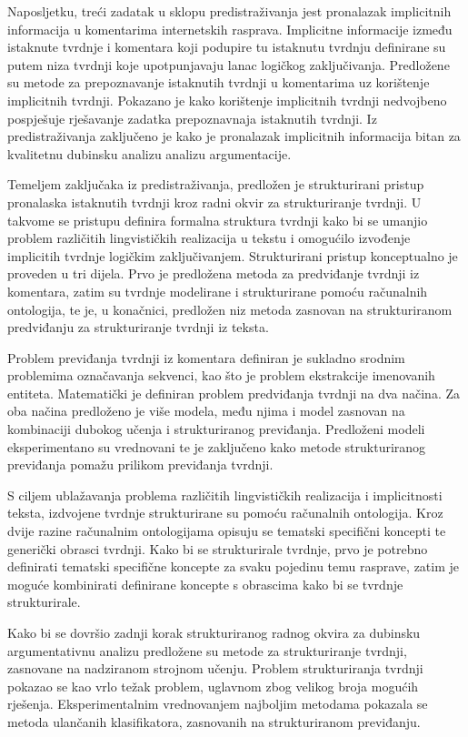 Naposljetku, treći zadatak u sklopu predistraživanja jest 
pronalazak implicitnih informacija u komentarima internetskih rasprava. 
Implicitne informacije između istaknute tvrdnje i komentara koji podupire 
tu istaknutu tvrdnju definirane su putem niza tvrdnji koje upotpunjavaju 
lanac logičkog zaključivanja. Predložene su metode za prepoznavanje istaknutih 
tvrdnji u komentarima uz korištenje implicitnih tvrdnji. 
Pokazano je kako korištenje implicitnih tvrdnji nedvojbeno pospješuje 
rješavanje zadatka prepoznavnaja istaknutih tvrdnji. 
Iz predistraživanja zaključeno je kako je pronalazak implicitnih informacija
bitan za kvalitetnu dubinsku analizu analizu argumentacije. 

Temeljem zaključaka iz predistraživanja, predložen je 
strukturirani pristup pronalaska istaknutih tvrdnji kroz 
radni okvir za strukturiranje tvrdnji. 
U takvome se pristupu definira formalna struktura tvrdnji kako bi se
umanjio problem različitih lingvističkih realizacija u tekstu i omogućilo
izvođenje implicitih tvrdnje logičkim zaključivanjem. 
Strukturirani pristup konceptualno je proveden u tri dijela. 
Prvo je predložena metoda za predviđanje tvrdnji iz komentara, 
zatim su tvrdnje modelirane i strukturirane pomoću računalnih ontologija,
te je, u konačnici, predložen niz metoda zasnovan na strukturiranom 
predviđanju za strukturiranje tvrdnji iz teksta. 

Problem previđanja tvrdnji iz komentara definiran je sukladno srodnim
problemima označavanja sekvenci, kao što je problem ekstrakcije imenovanih
entiteta.  Matematički je definiran problem predviđanja tvrdnji na dva načina.  Za oba načina
predloženo je više modela, među njima i model zasnovan na kombinaciji dubokog
učenja i strukturiranog previđanja. Predloženi modeli eksperimentano su vrednovani 
te je zaključeno kako metode strukturiranog previđanja pomažu
prilikom previđanja tvrdnji. 

S ciljem ublažavanja problema različitih lingvističkih realizacija 
i implicitnosti teksta, 
izdvojene tvrdnje strukturirane su pomoću računalnih ontologija. 
Kroz dvije razine računalnim ontologijama opisuju se tematski specifični koncepti te 
generički obrasci tvrdnji. Kako bi se strukturirale tvrdnje, prvo je 
potrebno definirati tematski specifične koncepte 
za svaku pojedinu temu rasprave, zatim je moguće kombinirati 
definirane koncepte s obrascima kako bi se tvrdnje strukturirale. 

Kako bi se dovršio zadnji korak strukturiranog radnog okvira za dubinsku
argumentativnu analizu predložene su metode za strukturiranje tvrdnji,
zasnovane na nadziranom strojnom učenju. Problem strukturiranja
tvrdnji pokazao se kao vrlo težak problem, uglavnom zbog velikog
broja mogućih rješenja. Eksperimentalnim vrednovanjem najboljim
metodama pokazala se metoda ulančanih klasifikatora,
zasnovanih na strukturiranom previđanju. 

